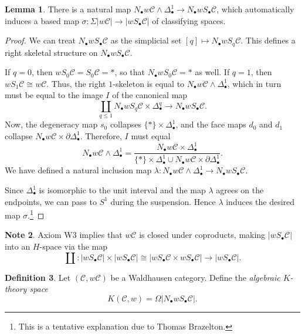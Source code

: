 \documentclass[10pt,letterpaper,cm]{nupset}
\theoremstyle{definition}
\newtheorem{definition}{Definition}
\newtheorem{note}[definition]{Note}
\theoremstyle{theorem}
\newtheorem{lemma}[definition]{Lemma}
\theoremstyle{remark}
\newcommand{\1}{\mathbf{1}}
\renewcommand{\c}{\mathscr{C}}
\newcommand{\0}{\vec 0}
\begin{document}
\begin{lemma}
There is a natural map $N_{\bullet} w{\c} \land \Delta_{\bullet}^1 \to N_{\bullet} w S_{\bullet} \c$, which automatically induces a based map $\sigma : \Sigma \left\lvert{w{\c}}\right\rvert\to \left\lvert{w S_{\bullet} \c}\right\rvert$ of classifying spaces.
\end{lemma}
\begin{proof}
We can treat $N_{\bullet} w S_{\bullet} \c$ as the simplicial set $[q] \mapsto N_{\bullet} w S_q \c$. This defines a right skeletal structure on $N_{\bullet} w S_{\bullet} \c$. 


 If $q = 0$, then $w S_0 \c = S_0 \c = \ast$, so that $N_{\bullet} w S_0\c = \ast$ as well. If $q= 1$, then
$w S_1 \c \cong w{\c}$. Thus, the right $1$-skeleton is equal to $N_{\bullet} w{\c}  \land \Delta_{\bullet}^1$, which in turn must be equal to the image $I$ of the canonical map $$\coprod_{q\leq 1} N_{\bullet} w S_q \c \times \Delta_{\bullet}^q \to N_{\bullet} w S_{\bullet} \c.$$ Now, the degeneracy map $s_0$ collapses $\{\ast\} \times \Delta_{\bullet}^1$, and the face maps $d_0$ and $d_1$ collapse $ N_{\bullet} w{\c} \times \partial{\Delta_{\bullet}^1}$. 
Therefore, $I$ must equal $$N_{\bullet} w{\c}  \land \Delta_{\bullet}^1  = \frac{N_{\bullet} w{\c} \times \Delta_{\bullet}^1}{\{\ast\} \times \Delta_{\bullet}^1 \cup N_{\bullet} w{\c} \times \partial{\Delta_{\bullet}^1}}.$$  We have defined a natural inclusion map $\lambda : N_{\bullet} w{\c} \land \Delta_{\bullet}^1 \to  N_{\bullet} w S_{\bullet} \c$.

Since $\Delta_{\bullet}^1$ is isomorphic to the unit interval and the map $\lambda$ agrees on the endpoints, we can pass to $S^1$ during the suspension. Hence $\lambda$  induces the desired map $\sigma$.\footnote{This is a tentative explanation due to Thomas Brazelton.}
\end{proof}

\begin{note}
Axiom W3 implies that $w{\c}$ is closed under coproducts, making $\left\lvert{wS_{\bullet} \c}\right\rvert$ into an $H$-space via the map $$\coprod: \left\lvert{wS_{\bullet} \c}\right\rvert \times \left\lvert{wS_{\bullet} \c}\right\rvert \cong \left\lvert{wS_{\bullet} \c \times  wS_{\bullet} \c}\right\rvert\to \left\lvert{wS_{\bullet} \c}\right\rvert.$$
\end{note}

\begin{definition}
Let $\left(\c, w{\c}\right)$ be a Waldhausen category. Define the \textit{algebraic $K$-theory space} $$K(\c, w) = \Omega \left\lvert{ N_{\bullet} wS_{\bullet} \c}\right\rvert.$$ 
\end{definition}
\end{document}
